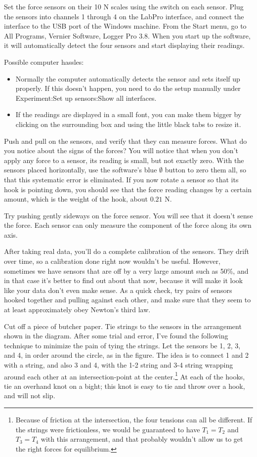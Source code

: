 Set the force sensors on their 10 N scales using the switch on each
sensor.
Plug the sensors into channels 1 through 4 on the LabPro interface, and connect the
interface to the USB port of the Windows machine.
From the Start menu, go to All Programs, Vernier Software, Logger Pro 3.8.
When you start up the software, it will automatically detect
the four sensors and start displaying their readings. 


Possible computer hassles:
\begin{itemize}
\item[] Normally the computer automatically detects the sensor and sets itself up
properly. If this doesn't happen, you need to do the setup manually under
Experiment:Set up sensors:Show all interfaces.
\item[] If the readings are displayed in a small font, you can make them bigger
by clicking on the surrounding box and using the little black tabs to resize it.
\end{itemize}

Push and pull on the sensors, and verify that they can measure forces.
What do you notice about the signs of the forces?
You will notice that when you don't apply any force to a sensor, its reading
is small, but not exactly zero.
With the sensors placed horizontally, use the software's blue $\emptyset$ button to zero them all, so that
this systematic error is eliminated. If you now rotate a sensor so that its hook
is pointing down, you should see that the force reading changes by a certain amount,
which is the weight of the hook, about $0.21$ N.

Try pushing gently sideways on the force sensor. You will see that it doesn't
sense the force.
Each sensor can only measure the component of the force along its
own axis.

After taking real data, you'll do a complete calibration of the
sensors. They drift over time, so a calibration done right now wouldn't be useful.
However, sometimes we have sensors that are off by a very large
amount such as 50\%, and in that case it's better to find out about that now, because
it will make it look like your data don't even make sense. As a quick check, try
pairs of sensors hooked together and pulling against each other, and make sure that
they seem to at least approximately obey Newton's third law.

Cut off a piece of butcher paper. Tie strings to the sensors in the arrangement shown in the diagram.
After some trial and error, I've found the following technique to minimize the
pain of tying the strings. Let the sensors be 1, 2, 3, and 4, in order around the
circle, as in the figure. The idea is to connect 1 and 2 with a string, and also
3 and 4, with the 1-2 string and 3-4 string wrapping around each other at an intersection-point at the 
center.\footnote{Because of friction at the intersection, the four tensions can all be different.
If the strings
were frictionless, we would be guaranteed to have $T_1=T_2$ and $T_3=T_4$ with this arrangement, and
that probably wouldn't allow us to get the right forces for equilibrium.}
At each of the hooks, tie an overhand knot on a bight; this knot is easy
to tie and throw over a hook, and will not slip.

